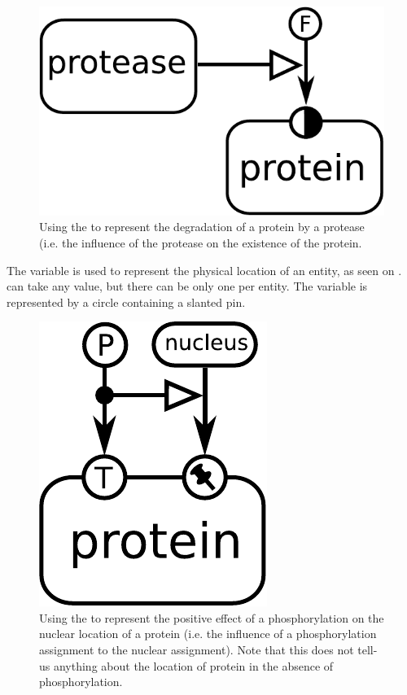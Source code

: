\begin{figure}[H]
  \centering
  \includegraphics[scale = 0.5]{examples/existence-degradation}
  \caption{Using the   to represent the degradation of a protein by a protease (i.e. the influence of the protease on the existence of the protein.}
  \label{fig:existence}
\end{figure}

The variable  is used to represent the physical location of an entity, as seen on .  can take any value, but there can be only one  per entity. The variable is represented by a circle containing a slanted pin.

\begin{figure}[H]
  \centering
  \includegraphics[scale = 0.5]{examples/location-phosphorylation}
  \caption{Using the   to represent the positive effect of a phosphorylation on the nuclear location of a protein (i.e. the influence of a phosphorylation assignment to the nuclear assignment). Note that this does not tell-us anything about the location of protein in the absence of phosphorylation.}
  \label{fig:location}
\end{figure}

\normalcolor


